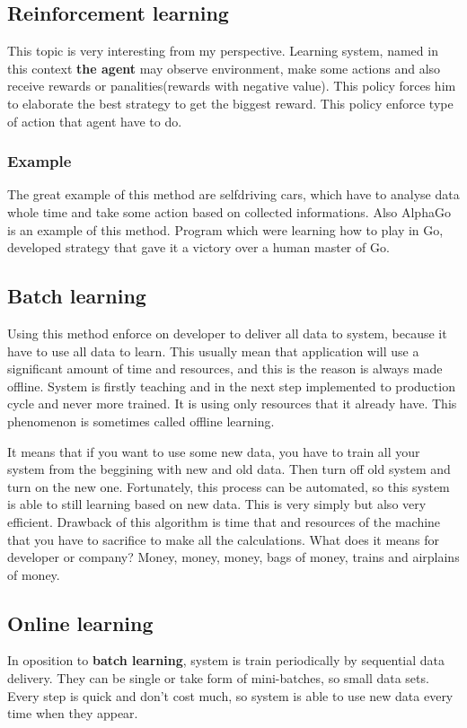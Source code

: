 \documentclass{article}
\begin{document}
   \newpage

  \subsection{Reinforcement learning}
  This topic is very interesting from my perspective. Learning system, named in this context \textbf{the agent} may observe environment, make some actions and also receive rewards or panalities(rewards with negative value). This policy forces him to elaborate the best strategy to get the biggest reward. This policy enforce type of action that agent have to do.

    \subsubsection{Example}
    The great example of this method are selfdriving cars, which have to analyse data whole time and take some action based on collected informations. Also AlphaGo is an example of this method. Program which were learning how to play in Go, developed strategy that gave it a victory over a human master of Go.
  
  \newpage

  \subsection{Batch learning}
  Using this method enforce on developer to deliver all data to system, because it have to use all data to learn. This usually mean that application will use a significant amount of time and resources, and this is the reason is always made offline. System is firstly teaching and in the next step implemented to production cycle and never more trained. It is using only resources that it already have. This phenomenon is sometimes called offline learning. 

  It means that if you want to use some new data, you have to train all your system from the beggining with new and old data. Then turn off old system and turn on the new one. Fortunately, this process can be automated, so this system is able to still learning based on new data. This is very simply but also very efficient. Drawback of this algorithm is time that and resources of the machine that you have to sacrifice to make all the calculations. What does it means for developer or company? Money, money, money, bags of money, trains and airplains of money.

  \newpage

  \subsection{Online learning}
  In oposition to \textbf{batch learning}, system is train periodically by sequential data delivery. They can be single or take form of mini-batches, so small data sets. Every step is quick and don't cost much, so system is able to use new data every time when they appear.
\end{document}
